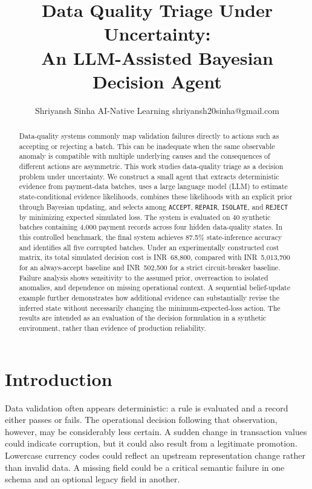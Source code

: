 \documentclass{article}
\title{Data Quality Triage Under Uncertainty:\\
An LLM-Assisted Bayesian Decision Agent}
\author{
Shriyansh Sinha
\affiliations
AI-Native Learning
\emails
shriyansh20sinha@gmail.com
}
\begin{document}
\maketitle

\begin{abstract}
Data-quality systems commonly map validation failures directly to actions such as accepting or rejecting a batch. This can be inadequate when the same observable anomaly is compatible with multiple underlying causes and the consequences of different actions are asymmetric. This work studies data-quality triage as a decision problem under uncertainty. We construct a small agent that extracts deterministic evidence from payment-data batches, uses a large language model (LLM) to estimate state-conditional evidence likelihoods, combines these likelihoods with an explicit prior through Bayesian updating, and selects among \texttt{ACCEPT}, \texttt{REPAIR}, \texttt{ISOLATE}, and \texttt{REJECT} by minimizing expected simulated loss. The system is evaluated on 40 synthetic batches containing 4,000 payment records across four hidden data-quality states. In this controlled benchmark, the final system achieves 87.5\% state-inference accuracy and identifies all five corrupted batches. Under an experimentally constructed cost matrix, its total simulated decision cost is INR~68,800, compared with INR~5,013,700 for an always-accept baseline and INR~502,500 for a strict circuit-breaker baseline. Failure analysis shows sensitivity to the assumed prior, overreaction to isolated anomalies, and dependence on missing operational context. A sequential belief-update example further demonstrates how additional evidence can substantially revise the inferred state without necessarily changing the minimum-expected-loss action. The results are intended as an evaluation of the decision formulation in a synthetic environment, rather than evidence of production reliability.
\end{abstract}


\section{Introduction}

Data validation often appears deterministic: a rule is evaluated and a record either passes or fails. The operational decision following that observation, however, may be considerably less certain. A sudden change in transaction values could indicate corruption, but it could also result from a legitimate promotion. Lowercase currency codes could reflect an upstream representation change rather than invalid data. A missing field could be a critical semantic failure in one schema and an optional legacy field in another.
\end{document}
